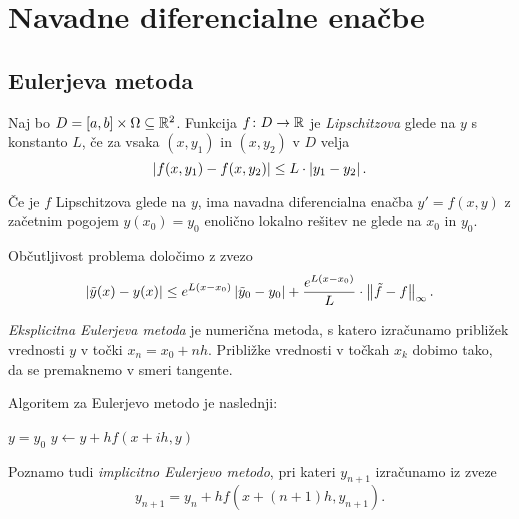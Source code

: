 \section{Navadne diferencialne enačbe}

\subsection{Eulerjeva metoda}

\begin{definicija}
Naj bo $D = [a, b] \times \Omega \subseteq \mathbb{R}^2$. Funkcija
$f \colon D \to \mathbb{R}$ je
\emph{Lipschitzova} glede na $y$ s
konstanto $L$, če za vsaka $(x, y_1)$ in $(x, y_2)$ v $D$ velja
\[
\left\lvert f(x, y_1) - f(x, y_2)\right\rvert \leq L \cdot \left\lvert y_1 - y_2\right\rvert.
\]
\end{definicija}

\begin{opomba}
Če je $f$ Lipschitzova glede na $y$, ima navadna diferencialna
enačba $y' = f(x,y)$ z začetnim pogojem $y(x_0) = y_0$ enolično
lokalno rešitev ne glede na $x_0$ in $y_0$.
\end{opomba}

\begin{opomba}
Občutljivost problema določimo z zvezo
\[
\left\lvert \tilde{y}(x) - y(x)\right\rvert \leq
e^{L(x - x_0)} \left\lvert \tilde{y}_0 - y_0\right\rvert +
\frac{e^{L(x - x_0)}}{L} \cdot \left\lVert \tilde{f} - f\right\rVert_\infty.
\]
\end{opomba}

\begin{definicija}
\emph{Eksplicitna Eulerjeva metoda}
je numerična metoda, s katero izračunamo približek vrednosti $y$ v
točki $x_n = x_0 + n h$. Približke vrednosti v točkah $x_k$ dobimo
tako, da se premaknemo v smeri tangente.
\end{definicija}

\begin{opomba}
Algoritem za Eulerjevo metodo je naslednji:

\begin{algorithmic}[1]
\State $y = y_0$
  \State $y \gets y + h f(x + ih, y)$
\EndFor
\end{algorithmic}
\end{opomba}

\begin{opomba}
Poznamo tudi \emph{implicitno Eulerjevo metodo}, pri kateri
$y_{n+1}$ izračunamo iz zveze
\[
y_{n+1} = y_n + h f(x + (n+1)h, y_{n+1}).
\]
\end{opomba}

